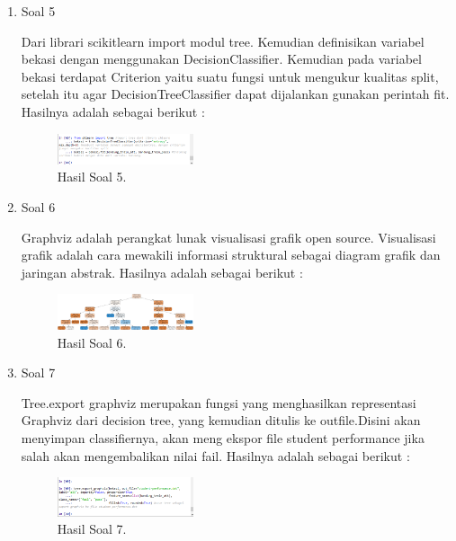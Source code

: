 \begin{enumerate}
	\item Soal 5
	\hfill\break
	
	Dari librari scikitlearn import modul tree. Kemudian definisikan variabel bekasi dengan menggunakan DecisionClassifier. Kemudian pada variabel bekasi terdapat Criterion yaitu suatu fungsi untuk mengukur kualitas split, setelah itu agar DecisionTreeClassifier dapat dijalankan gunakan perintah fit. Hasilnya adalah sebagai berikut :
	\begin{figure}[H]
	\centering
		\includegraphics[width=4cm]{figures/1174096/tugas2/2/hasil5.PNG}
		\caption{Hasil Soal 5.}
	\end{figure}

	\item Soal 6
	\hfill\break
	
	Graphviz adalah perangkat lunak visualisasi grafik open source. Visualisasi grafik adalah cara mewakili informasi struktural sebagai diagram grafik dan jaringan abstrak. Hasilnya adalah sebagai berikut :
	\begin{figure}[H]
	\centering
		\includegraphics[width=4cm]{figures/1174096/tugas2/2/hasil6.PNG}
		\caption{Hasil Soal 6.}
	\end{figure}

	\item Soal 7
	\hfill\break
	
	Tree.export graphviz merupakan fungsi yang menghasilkan representasi Graphviz dari decision tree, yang kemudian ditulis ke outfile.Disini akan menyimpan classifiernya, akan meng ekspor file student performance jika salah akan mengembalikan nilai fail. Hasilnya adalah sebagai berikut :
	\begin{figure}[H]
	\centering
		\includegraphics[width=4cm]{figures/1174096/tugas2/2/hasil7.PNG}
		\caption{Hasil Soal 7.}
	\end{figure}


\end{enumerate}
